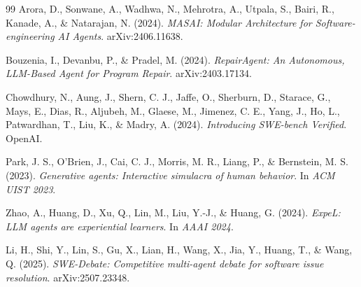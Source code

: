 \documentclass[runningheads]{llncs}
\begin{document}
\begin{thebibliography}{99}
Arora, D., Sonwane, A., Wadhwa, N., Mehrotra, A., Utpala, S., Bairi, R., Kanade, A., \& Natarajan, N. (2024).
\newblock \textit{MASAI: Modular Architecture for Software-engineering AI Agents}.
\newblock arXiv:2406.11638.

Bouzenia, I., Devanbu, P., \& Pradel, M. (2024).
\newblock \textit{RepairAgent: An Autonomous, LLM-Based Agent for Program Repair}.
\newblock arXiv:2403.17134.

Chowdhury, N., Aung, J., Shern, C. J., Jaffe, O., Sherburn, D., Starace, G., Mays, E., Dias, R., Aljubeh, M., Glaese, M., Jimenez, C. E., Yang, J., Ho, L., Patwardhan, T., Liu, K., \& Madry, A. (2024).
\newblock \textit{Introducing SWE-bench Verified}.
\newblock OpenAI.

Park, J. S., O'Brien, J., Cai, C. J., Morris, M. R., Liang, P., \& Bernstein, M. S. (2023).
\newblock \textit{Generative agents: Interactive simulacra of human behavior}.
\newblock In \textit{ACM UIST 2023}.

Zhao, A., Huang, D., Xu, Q., Lin, M., Liu, Y.-J., \& Huang, G. (2024).
\newblock \textit{ExpeL: LLM agents are experiential learners}.
\newblock In \textit{AAAI 2024}.

Li, H., Shi, Y., Lin, S., Gu, X., Lian, H., Wang, X., Jia, Y., Huang, T., \& Wang, Q. (2025).
\newblock \textit{SWE-Debate: Competitive multi-agent debate for software issue resolution}.
\newblock arXiv:2507.23348.

\end{thebibliography}
\end{document}
